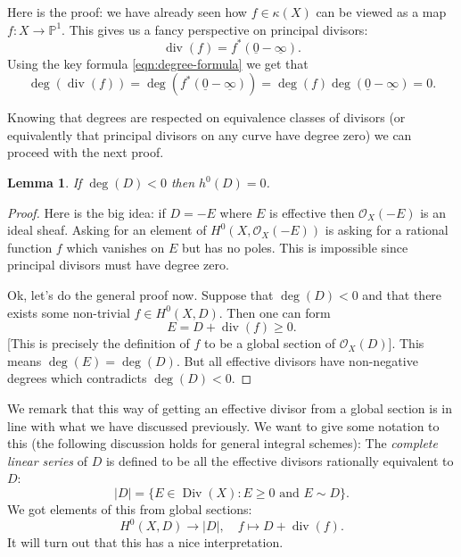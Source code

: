 \documentclass[12pt]{article}
\numberwithin{equation}{section}
\newtheorem{lemma}[theorem]{Lemma}
\theoremstyle{definition}
\theoremstyle{remark}
\newcommand{\Ocal}{\mathcal{O}}
\newcommand{\PP}{\mathbb{P}}
\newcommand{\Div}{\operatorname{Div}}
\renewcommand{\div}{\operatorname{div}}
\begin{document}
Here is the proof: we have already seen how $f\in \kappa(X)$ can be viewed as a map $f:X\to \PP^1$. 
This gives us a fancy perspective on principal divisors:
 $$ \div (f) = f^*( \underline{0} - \underline{\infty}). $$
Using the key formula \eqref{eqn:degree-formula} we get that 
 $$\deg(\div(f))= \deg(f^*( \underline{0} - \underline{\infty})) = \deg(f) \deg(\underline{0} - \underline{\infty}) = 0.$$

Knowing that degrees are respected on equivalence classes of divisors (or equivalently that principal divisors on any curve have degree zero) we can proceed with the next proof. 

\begin{lemma}
	If $\deg(D)<0$ then $h^0(D)=0$. 
\end{lemma}
\begin{proof}
	Here is the big idea: if $D=-E$ where $E$ is effective then $\Ocal_X(-E)$ is an ideal sheaf. 
	Asking for an element of $H^0(X,\Ocal_X(-E))$ is asking for a rational function $f$ which vanishes on $E$ but has no poles. 
	This is impossible since principal divisors must have degree zero. 
	
	Ok, let's do the general proof now. 
	Suppose that $\deg(D)<0$ and that there exists some non-trivial $f\in H^0(X,D)$. 
	Then one can form 
	 $$ E = D + \div(f) \geq 0.$$
	[This is precisely the definition of $f$ to be a global section of $\Ocal_X(D)$].
	This means $\deg(E) = \deg(D)$. 
	But all effective divisors have non-negative degrees which contradicts $\deg(D)<0$. 
\end{proof}

We remark that this way of getting an effective divisor from a global section is in line with what we have discussed previously. 
We want to give some notation to this (the following discussion holds for general integral schemes):
The \emph{complete linear series} of $D$ is defined to be all the effective divisors rationally equivalent to $D$:
  $$ \vert D \vert = \lbrace E \in \Div(X) \colon E \geq 0 \mbox{ and } E \sim D \rbrace.$$
We got elements of this from global sections:
 $$ H^0(X,D) \to \vert D \vert, \quad f \mapsto D + \div(f). $$
It will turn out that this has a nice interpretation.
\end{document}
